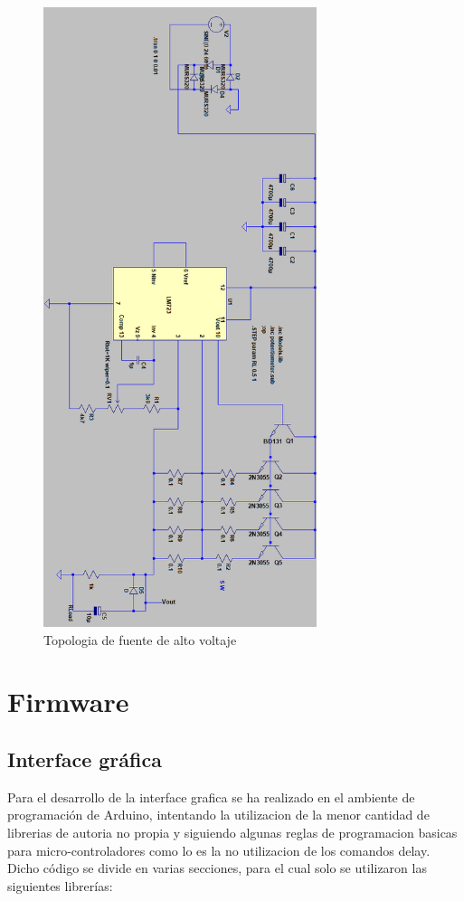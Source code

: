 \begin{figure}[H]
\centering
\includegraphics[width=8cm]{Capitulo3/figs/sim.png}
\caption{Topologia de fuente de alto voltaje}
\end{figure}


\section{Firmware}
\subsection{Interface gráfica}
Para el desarrollo de la interface grafica se ha realizado en el ambiente de programación de Arduino, intentando la utilizacion de la menor cantidad de librerias de autoria no propia y siguiendo algunas reglas de programacion basicas para micro-controladores como lo es la no utilizacion de los comandos delay. Dicho código se divide en varias secciones, para el cual solo se utilizaron las siguientes librerías:

